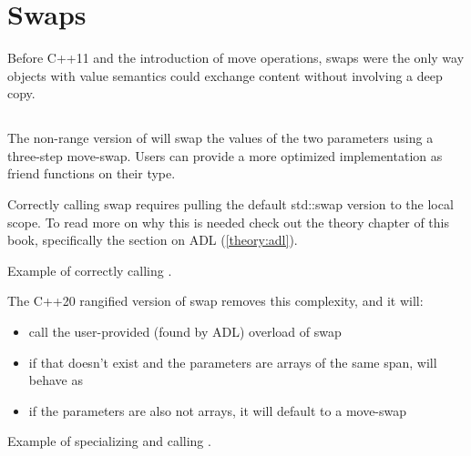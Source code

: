 \section{Swaps}

Before C++11 and the introduction of move operations, swaps were the only way objects with value semantics could exchange content without involving a deep copy.

\subsection{\texorpdfstring{}{\texttt{std::swap}}}

The non-range version of  will swap the values of the two parameters using a three-step move-swap. Users can provide a more optimized implementation as friend functions on their type.


Correctly calling swap requires pulling the default std::swap version to the local scope. To read more on why this is needed check out the theory chapter of this book, specifically the section on ADL (\ref{theory:adl}).

\begin{codebox}[breakable]{\href{https://compiler-explorer.com/z/Yzvzrb4rY}{\ExternalLink}}
\footnotesize Example of correctly calling .
\tcblower
{}
\end{codebox}

The C++20 rangified version of swap removes this complexity, and it will:

\begin{itemize}
    \item call the user-provided (found by ADL) overload of swap
    \item if that doesn't exist and the parameters are arrays of the same span,  will behave as 
    \item if the parameters are also not arrays, it will default to a move-swap
\end{itemize}

\begin{codebox}[]{\href{https://compiler-explorer.com/z/8GxdMxsan}{\ExternalLink}}
\footnotesize Example of specializing and calling .
\tcblower
{}
\end{codebox}

